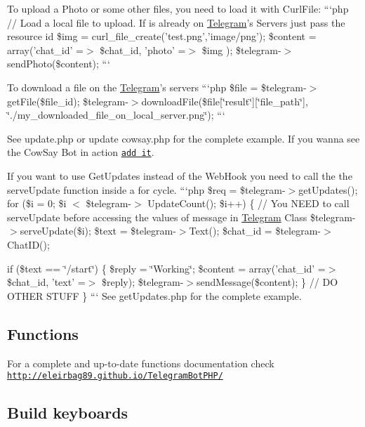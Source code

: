 To upload a Photo or some other files, you need to load it with Curl\-File\-: ```php // Load a local file to upload. If is already on \hyperlink{class_telegram}{Telegram}'s Servers just pass the resource id \$img = curl\-\_\-file\-\_\-create('test.\-png','image/png'); \$content = array('chat\-\_\-id' =$>$ \$chat\-\_\-id, 'photo' =$>$ \$img ); \$telegram-\/$>$send\-Photo(\$content); ```

To download a file on the \hyperlink{class_telegram}{Telegram}'s servers ```php \$file = \$telegram-\/$>$get\-File(\$file\-\_\-id); \$telegram-\/$>$download\-File(\$file\mbox{[}\char`\"{}result\char`\"{}\mbox{]}\mbox{[}\char`\"{}file\-\_\-path\char`\"{}\mbox{]}, \char`\"{}./my\-\_\-downloaded\-\_\-file\-\_\-on\-\_\-local\-\_\-server.\-png\char`\"{}); ```

See update.\-php or update cowsay.\-php for the complete example. If you wanna see the Cow\-Say Bot in action \href{https://telegram.me/cowmooobot}{\tt add it}.

If you want to use Get\-Updates instead of the Web\-Hook you need to call the the {\ttfamily serve\-Update} function inside a for cycle. ```php \$req = \$telegram-\/$>$get\-Updates(); for (\$i = 0; \$i $<$ \$telegram-\/$>$ Update\-Count(); \$i++) \{ // You N\-E\-E\-D to call serve\-Update before accessing the values of message in \hyperlink{class_telegram}{Telegram} Class \$telegram-\/$>$serve\-Update(\$i); \$text = \$telegram-\/$>$Text(); \$chat\-\_\-id = \$telegram-\/$>$Chat\-I\-D();

if (\$text == \char`\"{}/start\char`\"{}) \{ \$reply = \char`\"{}\-Working\char`\"{}; \$content = array('chat\-\_\-id' =$>$ \$chat\-\_\-id, 'text' =$>$ \$reply); \$telegram-\/$>$send\-Message(\$content); \} // D\-O O\-T\-H\-E\-R S\-T\-U\-F\-F \} ``` See get\-Updates.\-php for the complete example.

\subsection*{Functions }

For a complete and up-\/to-\/date functions documentation check \href{http://eleirbag89.github.io/TelegramBotPHP/}{\tt http\-://eleirbag89.\-github.\-io/\-Telegram\-Bot\-P\-H\-P/}

\subsection*{Build keyboards }

